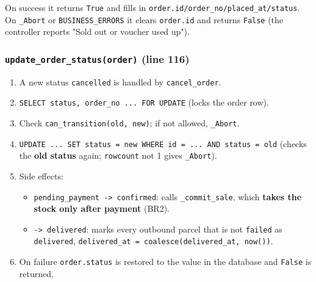On success it returns \texttt{True} and fills in
\texttt{order.\allowbreak{}id/\allowbreak{}order\_\allowbreak{}no/\allowbreak{}placed\_\allowbreak{}at/\allowbreak{}status}. On \texttt{\_\allowbreak{}Abort} or
\texttt{BUSINESS\_\allowbreak{}ERRORS} it clears \texttt{order.\allowbreak{}id} and returns
\texttt{False} (the controller reports "Sold out or voucher used up").

\hypertarget{update_order_statusorder-line-116}{%
\subsubsection{\texorpdfstring{\texttt{update\_\allowbreak{}order\_\allowbreak{}status(\allowbreak{}order)}
(line
116)}{update\_order\_status(order) (line 116)}}\label{update_order_statusorder-line-116}}

\begin{enumerate}
\def\labelenumi{\arabic{enumi}.}
\tightlist
\item
  A new status \texttt{cancelled} is handled by \texttt{cancel\_\allowbreak{}order}.
\item
  \texttt{SELECT status,\allowbreak{} order\_\allowbreak{}no .\allowbreak{}.\allowbreak{}.\allowbreak{} FOR UPDATE} (locks the order
  row).
\item
  Check \texttt{can\_\allowbreak{}transition(\allowbreak{}old,\allowbreak{} new)}; if not allowed,
  \texttt{\_\allowbreak{}Abort}.
\item
  \texttt{UPDATE .\allowbreak{}.\allowbreak{}.\allowbreak{} SET status =\allowbreak{} new WHERE id =\allowbreak{} .\allowbreak{}.\allowbreak{}.\allowbreak{} AND status =\allowbreak{} old}
  (checks the \textbf{old status} again; \texttt{rowcount} not 1 gives
  \texttt{\_\allowbreak{}Abort}).
\item
  Side effects:

  \begin{itemize}
  \tightlist
  \item
    \texttt{pending\_\allowbreak{}payment -\textgreater{}\allowbreak{} confirmed}: calls
    \texttt{\_\allowbreak{}commit\_\allowbreak{}sale}, which \textbf{takes the stock only after
    payment} (BR2).
  \item
    \texttt{-\textgreater{}\allowbreak{} delivered}: marks every outbound parcel
    that is not \texttt{failed} as \texttt{delivered},
    \texttt{delivered\_\allowbreak{}at =\allowbreak{} coalesce(\allowbreak{}delivered\_\allowbreak{}at,\allowbreak{} now(\allowbreak{}))}.
  \end{itemize}
\item
  On failure \texttt{order.\allowbreak{}status} is restored to the value in the
  database and \texttt{False} is returned.
\end{enumerate}

